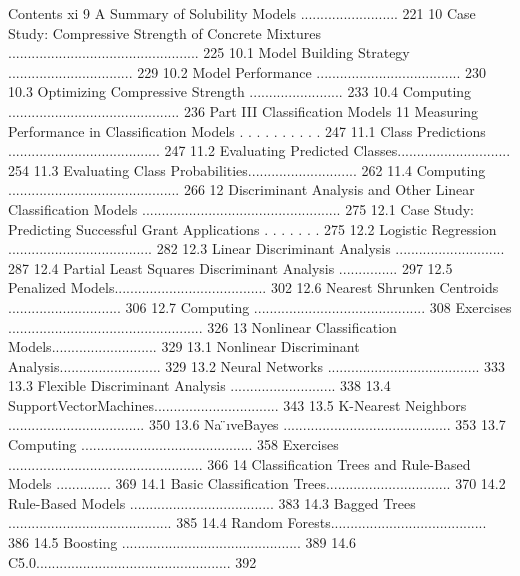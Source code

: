 Contents xi
9 A Summary of Solubility Models ......................... 221
10 Case Study: Compressive Strength of Concrete
Mixtures ................................................. 225 10.1 Model Building Strategy ................................ 229 10.2 Model Performance ..................................... 230 10.3 Optimizing Compressive Strength ........................ 233 10.4 Computing ............................................ 236
Part III Classification Models
11 Measuring Performance in Classification Models . . . . . . . . . . 247 11.1 Class Predictions ....................................... 247 11.2 Evaluating Predicted Classes............................. 254 11.3 Evaluating Class Probabilities............................ 262 11.4 Computing ............................................ 266
12 Discriminant Analysis and Other Linear Classification Models ................................................... 275 12.1 Case Study: Predicting Successful Grant Applications . . . . . . . 275 12.2 Logistic Regression ..................................... 282 12.3 Linear Discriminant Analysis ............................ 287 12.4 Partial Least Squares Discriminant Analysis ............... 297 12.5 Penalized Models....................................... 302 12.6 Nearest Shrunken Centroids ............................. 306 12.7 Computing ............................................ 308 Exercises .................................................. 326
13 Nonlinear Classification Models........................... 329 13.1 Nonlinear Discriminant Analysis.......................... 329 13.2 Neural Networks ....................................... 333 13.3 Flexible Discriminant Analysis ........................... 338 13.4 SupportVectorMachines................................ 343 13.5 K-Nearest Neighbors ................................... 350 13.6 Na ̈ıveBayes ........................................... 353 13.7 Computing ............................................ 358 Exercises .................................................. 366
14 Classification Trees and Rule-Based Models .............. 369 14.1 Basic Classification Trees................................ 370 14.2 Rule-Based Models ..................................... 383 14.3 Bagged Trees .......................................... 385 14.4 Random Forests........................................ 386 14.5 Boosting .............................................. 389 14.6 C5.0.................................................. 392

